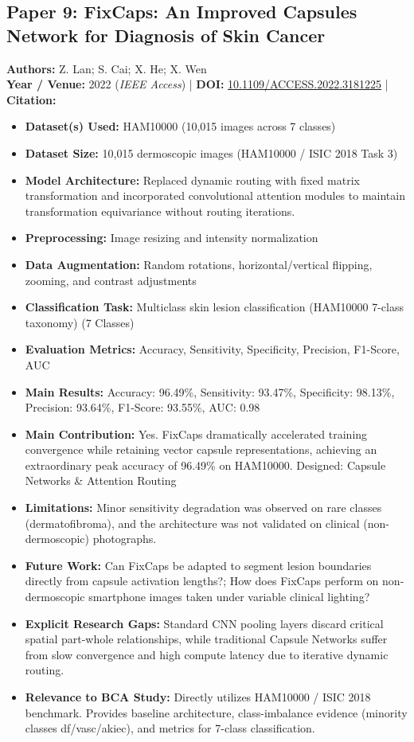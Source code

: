 \documentclass[11pt,a4paper]{article}
\begin{document}
\subsection{Paper 9: FixCaps: An Improved Capsules Network for Diagnosis of Skin Cancer}
\textbf{Authors:} Z. Lan; S. Cai; X. He; X. Wen \\
\textbf{Year / Venue:} 2022 (\textit{IEEE Access}) | \textbf{DOI:} \href{https://doi.org/10.1109/ACCESS.2022.3181225}{10.1109/ACCESS.2022.3181225} | \textbf{Citation:} \cite{9791221}

\begin{itemize}\small
\item \textbf{Dataset(s) Used:} HAM10000 (10,015 images across 7 classes)
\item \textbf{Dataset Size:} 10,015 dermoscopic images (HAM10000 / ISIC 2018 Task 3)
\item \textbf{Model Architecture:} Replaced dynamic routing with fixed matrix transformation and incorporated convolutional attention modules to maintain transformation equivariance without routing iterations.
\item \textbf{Preprocessing:} Image resizing and intensity normalization
\item \textbf{Data Augmentation:} Random rotations, horizontal/vertical flipping, zooming, and contrast adjustments
\item \textbf{Classification Task:} Multiclass skin lesion classification (HAM10000 7-class taxonomy) (7 Classes)
\item \textbf{Evaluation Metrics:} Accuracy, Sensitivity, Specificity, Precision, F1-Score, AUC
\item \textbf{Main Results:} Accuracy: 96.49\%, Sensitivity: 93.47\%, Specificity: 98.13\%, Precision: 93.64\%, F1-Score: 93.55\%, AUC: 0.98
\item \textbf{Main Contribution:} Yes. FixCaps dramatically accelerated training convergence while retaining vector capsule representations, achieving an extraordinary peak accuracy of 96.49\% on HAM10000. Designed: Capsule Networks \& Attention Routing
\item \textbf{Limitations:} Minor sensitivity degradation was observed on rare classes (dermatofibroma), and the architecture was not validated on clinical (non-dermoscopic) photographs.
\item \textbf{Future Work:} Can FixCaps be adapted to segment lesion boundaries directly from capsule activation lengths?; How does FixCaps perform on non-dermoscopic smartphone images taken under variable clinical lighting?
\item \textbf{Explicit Research Gaps:} Standard CNN pooling layers discard critical spatial part-whole relationships, while traditional Capsule Networks suffer from slow convergence and high compute latency due to iterative dynamic routing.
\item \textbf{Relevance to BCA Study:} Directly utilizes HAM10000 / ISIC 2018 benchmark. Provides baseline architecture, class-imbalance evidence (minority classes df/vasc/akiec), and metrics for 7-class classification.
\end{itemize}
\end{document}

